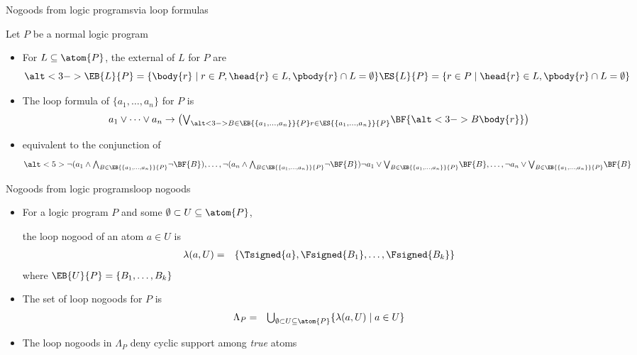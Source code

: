 \begin{frame}{Nogoods from logic programs}{via loop formulas}

  Let $P$ be a normal logic program

  \begin{itemize}
  \item <2-> For $L\subseteq\atom{P}$,
    the \alert{external } of $L$ for $P$ are
    \[
      \alt<3->{\EB{L}{P} = \{ \body{r}     \mid r\in P,\head{r}\in L, \pbody{r}\cap L=\emptyset \}}
              {\ES{L}{P} = \{       r \in P\mid        \head{r}\in L, \pbody{r}\cap L=\emptyset \}}
    \]
  \item<2-> The \alert{loop formula} of $\{a_1,\dots,a_n\}$ for $P$ is
    \[
      a_1\vee\dots\vee a_n
      \rightarrow
      \big(
      \textstyle{\bigvee_{\alt<3->{B\in\EB{\{a_1,\dots,a_n\}}{P}}{r\in\ES{\{a_1,\dots,a_n\}}{P}}}}\BF{\alt<3->{B}{\body{r}}}
      \big)
    \]
  \item<4->[] equivalent to the conjunction of
    \[
      \alt<5>{%
        \neg (     a_1\wedge\textstyle{\bigwedge_{B\in\EB{\{a_1,\dots,a_n\}}{P}}}\neg\BF{B})
        ,\dots,
        \neg (     a_n\wedge\textstyle{\bigwedge_{B\in\EB{\{a_1,\dots,a_n\}}{P}}}\neg\BF{B})}{%
              \neg a_1\vee  \textstyle{\bigvee  _{B\in\EB{\{a_1,\dots,a_n\}}{P}}}\BF{B}
        ,\dots,
              \neg a_n\vee  \textstyle{\bigvee  _{B\in\EB{\{a_1,\dots,a_n\}}{P}}}\BF{B}}
    \]
  \end{itemize}
\end{frame}
\begin{frame}{Nogoods from logic programs}{loop nogoods} %
  \begin{itemize}
  \item<1->
    For a logic program $P$ and some $\emptyset \subset U\subseteq\atom{P}$,
    \par
    the \alert{loop nogood} of an atom $a\in U$ is
    \begin{eqnarray*}
      \lambda(a,U)
      & = &
      \{\Tsigned{a},\Fsigned{B_1},\dots,\Fsigned{B_k}\}
    \end{eqnarray*}
    where $\EB{U}{P}=\{B_1,\dots,B_k\}$
    \medskip
  \item<2->
    The set of loop nogoods for $P$ is
    \begin{eqnarray*}
      \Lambda_P
      & = &
      \textstyle
      \bigcup_{\emptyset\subset U\subseteq \atom{P}}
      \{
      \lambda(a,U)
      \mid
      a\in U
      \}
    \end{eqnarray*}
  \item<3-> The loop nogoods in $\Lambda_P$ deny cyclic support among \emph{true} atoms
  \end{itemize}
\end{frame}

